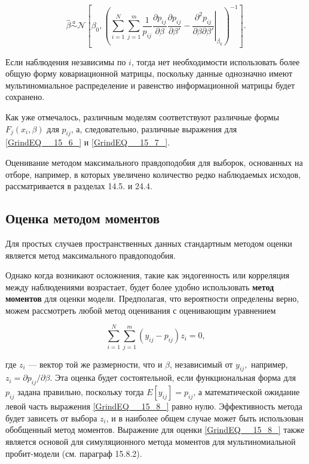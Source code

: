 \begin{equation} 
\label{GrindEQ__15_7_} 
\widehat{\beta }\overset{a}{\sim }{\mathcal N}
\left[{\beta }_0,
{\left({\left.\sum^N_{i=1}{\sum^m_{j=1}{\frac{1}{p_{ij}}\frac{\partial p_{ij}}{\partial \beta }
\frac{\partial p_{ij}}{\partial {\beta }'}-
\frac{{\partial }^2p_{ij}}{\partial \beta \partial{\beta }'}}}\right|}_{{\beta }_0}\right)}^{-1}
\right]. 
\end{equation} 

Если наблюдения независимы по $i$, тогда нет необходимости использовать более общую форму ковариационной матрицы, поскольку данные однозначно имеют мультиномиальное распределение и равенство информационной матрицы будет сохранено.

Как уже отмечалось, различным моделям соответствуют различные формы $F_j(x_i,\beta )$ для $p_{ij}$, а, следовательно, различные выражения для \eqref{GrindEQ__15_6_} и \eqref{GrindEQ__15_7_}.

Оценивание методом максимального правдоподобия для выборок, основанных на отборе, например, в которых увеличено количество редко наблюдаемых исходов, рассматривается в разделах 14.5. и 24.4.

\subsection{ Оценка методом моментов}

Для простых случаев пространственных данных стандартным методом оценки является метод максимального правдоподобия.

Однако когда возникают осложнения, такие как эндогенность или корреляция между наблюдениями  возрастает, будет более удобно использовать \textbf{метод моментов} для оценки модели. Предполагая, что вероятности определены верно, можем рассмотреть любой метод оценивания с оценивающим уравнением

\begin{equation} 
\label{GrindEQ__15_8_} 
\sum^N_{i=1}{\sum^m_{j=1}{\left(y_{ij}-p_{ij}\right)z_i=0,}} 
\end{equation} 

где $z_i$ --- вектор той же размерности, что и $\beta $, независимый от $y_{ij},$ например, $z_i={\partial p_{ij}}/{\partial \beta }.$ Эта оценка будет состоятельной, если функциональная форма для $p_{ij}$ задана правильно, поскольку тогда $E\left[y_{ij}\right]=p_{ij}$, а математической ожидание левой часть выражения \eqref{GrindEQ__15_8_}  равно нулю. Эффективность метода будет зависеть от выбора $z_i$, и в наиболее общем случае может быть использован обобщенный метод моментов. Выражение для оценки \eqref{GrindEQ__15_8_} также является основой для симуляционного метода моментов для мультиномиальной пробит-модели (см. параграф 15.8.2).

